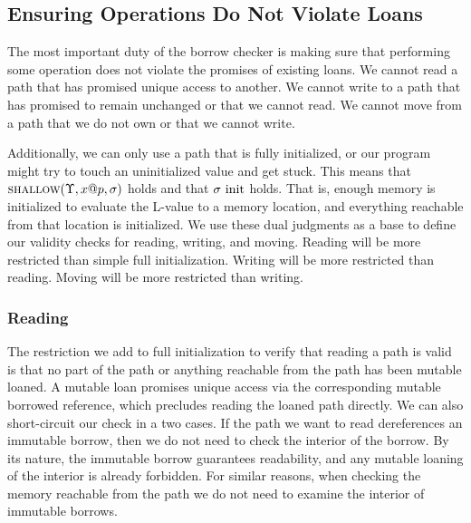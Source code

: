 \subsection*{Ensuring Operations Do Not Violate Loans}
The most important duty of the borrow checker is making sure that
performing some operation does not violate the promises of existing loans.
We cannot read a path that has promised unique access to another.
We cannot write to a path that has promised to remain unchanged or that we cannot read.
We cannot move from a path that we do not own or that we cannot write.

Additionally, we can only use a path that is fully initialized, or our program might
try to touch an uninitialized value and get stuck.
This means that $\textsc{shallow}({\Upsilon},{{x}@{p}},{\sigma})$ holds and that $\sigma\ \textrm{init}$ holds. 
That is, enough memory is initialized to evaluate the L-value to a memory location,
and everything reachable from that location is initialized.
We use these dual judgments as a base to define our validity 
checks for reading, writing, and moving.
Reading will be more restricted than simple full initialization.
Writing will be more restricted than reading.
Moving will be more restricted than writing.

\subsubsection*{Reading}
The restriction we add to full initialization to verify that reading a path is valid is
that no part of the path or anything reachable from the path has been mutable loaned.
A mutable loan promises unique access via the corresponding mutable borrowed reference, 
which precludes reading the loaned path directly.
We can also short-circuit our check in a two cases.
If the path we want to read dereferences an immutable borrow, then we do not need
to check the interior of the borrow. By its nature, the immutable borrow guarantees readability,
and any mutable loaning of the interior is already forbidden.
For similar reasons, when checking the memory reachable from the path 
we do not need to examine the interior of immutable borrows.
\newline

\fbox{$\cnml{\gs}$}


